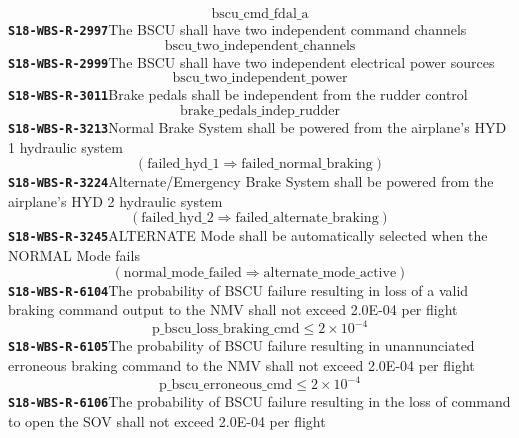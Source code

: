 \documentclass[11pt,a4paper]{article}
\begin{document}
\begin{dmath*}
\text{bscu\_cmd\_fdal\_a}
\end{dmath*}
\noindent\textbf{\texttt{S18-WBS-R-2997}}\quad The BSCU shall have two independent command channels
\begin{dmath*}
\text{bscu\_two\_independent\_channels}
\end{dmath*}
\noindent\textbf{\texttt{S18-WBS-R-2999}}\quad The BSCU shall have two independent electrical power sources
\begin{dmath*}
\text{bscu\_two\_independent\_power}
\end{dmath*}
\noindent\textbf{\texttt{S18-WBS-R-3011}}\quad Brake pedals shall be independent from the rudder control
\begin{dmath*}
\text{brake\_pedals\_indep\_rudder}
\end{dmath*}
\noindent\textbf{\texttt{S18-WBS-R-3213}}\quad Normal Brake System shall be powered from the airplane's HYD 1 hydraulic system
\begin{dmath*}
(\text{failed\_hyd\_1} \Rightarrow \text{failed\_normal\_braking})
\end{dmath*}
\noindent\textbf{\texttt{S18-WBS-R-3224}}\quad Alternate/Emergency Brake System shall be powered from the airplane's HYD 2 hydraulic system
\begin{dmath*}
(\text{failed\_hyd\_2} \Rightarrow \text{failed\_alternate\_braking})
\end{dmath*}
\noindent\textbf{\texttt{S18-WBS-R-3245}}\quad ALTERNATE Mode shall be automatically selected when the NORMAL Mode fails
\begin{dmath*}
(\text{normal\_mode\_failed} \Rightarrow \text{alternate\_mode\_active})
\end{dmath*}
\noindent\textbf{\texttt{S18-WBS-R-6104}}\quad The probability of BSCU failure resulting in loss of a valid braking command output to the NMV shall not exceed 2.0E-04 per flight
\begin{dmath*}
\text{p\_bscu\_loss\_braking\_cmd} \leq 2 \times 10^{-4}
\end{dmath*}
\noindent\textbf{\texttt{S18-WBS-R-6105}}\quad The probability of BSCU failure resulting in unannunciated erroneous braking command to the NMV shall not exceed 2.0E-04 per flight
\begin{dmath*}
\text{p\_bscu\_erroneous\_cmd} \leq 2 \times 10^{-4}
\end{dmath*}
\noindent\textbf{\texttt{S18-WBS-R-6106}}\quad The probability of BSCU failure resulting in the loss of command to open the SOV shall not exceed 2.0E-04 per flight
\end{document}
